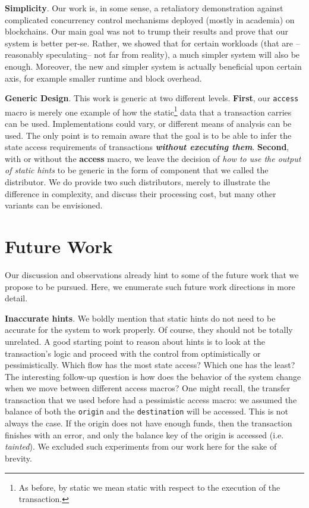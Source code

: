 \textbf{Simplicity}. Our work is, in some sense, a retaliatory demonstration against complicated
concurrency control mechanisms deployed (mostly in academia) on blockchains. Our main goal was not to
trump their results and prove that our system is better per-se. Rather, we showed that for certain
workloads (that are --reasonably speculating-- not far from reality), a much simpler system will
also be enough. Moreover, the new and simpler system is actually beneficial upon certain axis, for
example smaller runtime and block overhead.

\textbf{Generic Design}. This work is generic at two different levels. \textbf{First}, our
\texttt{access} macro is merely one example of how the static\footnote{As before, by static we mean
static with respect to the execution of the transaction.} data that a transaction carries can be
used. Implementations could vary, or different means of analysis can be used. The only point is to
remain aware that the goal is to be able to infer the state access requirements of transactions
\textit{\textbf{without executing them}}. \textbf{Second}, with or without the \textbf{access}
macro, we leave the decision of \textit{how to use the output of static hints} to be generic in the
form of component that we called the distributor. We do provide two such distributors, merely to
illustrate the difference in complexity, and discuss their processing cost, but many other variants
can be envisioned.

\section{Future Work}

Our discussion and observations already hint to some of the future work that we propose to be
pursued. Here, we enumerate such future work directions in more detail.

\textbf{Inaccurate hints}. We boldly mention that static hints do not need to be accurate for the
system to work properly. Of course, they should not be totally unrelated. A good starting point to
reason about hints is to look at the transaction's logic and proceed with the control from
optimistically or pessimistically. Which flow has the most state access? Which one has the least?
The interesting follow-up question is how does the behavior of the system change when we move
between different access macros? One might recall, the transfer transaction that we used before had
a pessimistic access macro: we assumed the balance of both the \texttt{origin} and the
\texttt{destination} will be accessed. This is not always the case. If the origin does not have
enough funds, then the transaction finishes with an error, and only the balance key of the origin is
accessed (i.e. \textit{tainted}). We excluded such experiments from our work here for the sake of
brevity.

